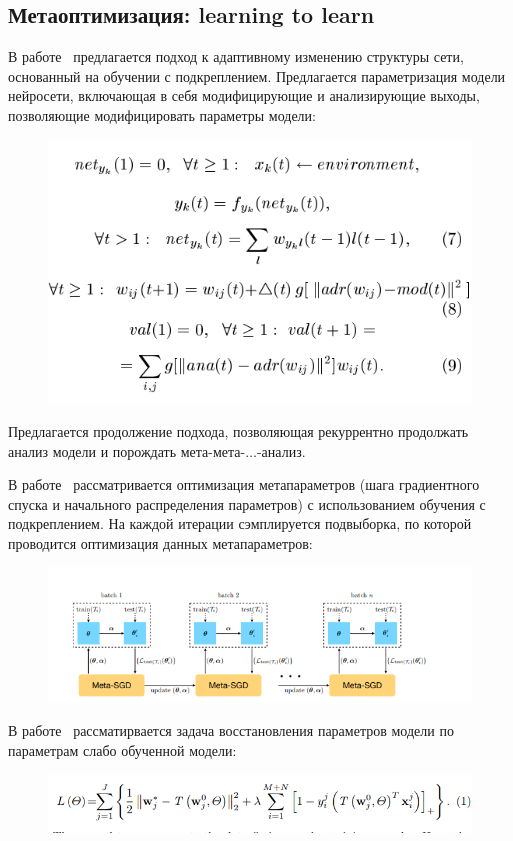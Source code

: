 \documentclass{article}
\begin{document}
\subsection{Метаоптимизация: learning to learn}
В работе~\cite{self_rnn} предлагается подход к адаптивному изменению структуры сети, основанный на обучении с подкреплением. Предлагается параметризация модели нейросети, включающая в себя модифицирующие и анализирующие выходы, позволяющие модифицировать параметры модели:
\begin{figure}[H]
\includegraphics[width=\textwidth]{./arch_review_figs/self_rnn.png}
\end{figure}
Предлагается продолжение подхода, позволяющая рекуррентно продолжать анализ модели и порождать мета-мета-$\dots$-анализ.

В работе~\cite{meta_sgd} рассматривается оптимизация метапараметров (шага градиентного спуска и начального распределения параметров) с использованием обучения с подкреплением. На каждой итерации сэмплируется подвыборка, по которой проводится оптимизация данных метапараметров:
\begin{figure}[H]
\includegraphics[width=\textwidth]{./arch_review_figs/meta_sgd.png}
\end{figure}

В работе~\cite{l2l} рассматирвается задача восстановления параметров модели по параметрам слабо обученной модели:
\begin{figure}[H]
\includegraphics[width=\textwidth]{./arch_review_figs/l2l.png}
\end{figure}
\end{document}
